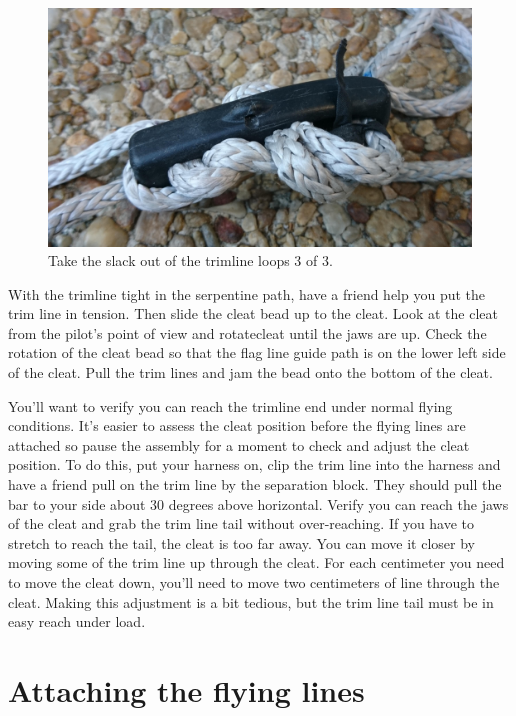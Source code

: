 \documentclass[]{book}
\begin{document}
\begin{figure}

{\centering \includegraphics[width=0.7\linewidth]{images/threading_the_cleat_5} 

}

\caption{Take the slack out of the trimline loops 3 of 3.}\label{fig:thread-cleat-5}
\end{figure}

With the trimline tight in the serpentine path, have a friend help you put the trim line in tension. Then slide the cleat bead up to the cleat. Look at the cleat from the pilot's point of view and rotatecleat until the jaws are up. Check the rotation of the cleat bead so that the flag line guide path is on the lower left side of the cleat. Pull the trim lines and jam the bead onto the bottom of the cleat.

You'll want to verify you can reach the trimline end under normal flying conditions. It's easier to assess the cleat position before the flying lines are attached so pause the assembly for a moment to check and adjust the cleat position. To do this, put your harness on, clip the trim line into the harness and have a friend pull on the trim line by the separation block. They should pull the bar to your side about 30 degrees above horizontal. Verify you can reach the jaws of the cleat and grab the trim line tail without over-reaching. If you have to stretch to reach the tail, the cleat is too far away. You can move it closer by moving some of the trim line up through the cleat. For each centimeter you need to move the cleat down, you'll need to move two centimeters of line through the cleat. Making this adjustment is a bit tedious, but the trim line tail must be in easy reach under load.

\hypertarget{attaching-the-flying-lines}{%
\section{Attaching the flying lines}\label{attaching-the-flying-lines}}
\end{document}
